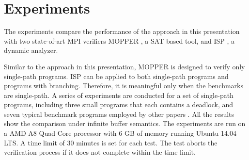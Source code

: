 \section{Experiments}
The experiments compare the performance of the approach in this presentation with two state-of-art MPI verifiers MOPPER \cite{DBLP:conf/fm/ForejtKNS14}, a SAT based tool, and ISP \cite{DBLP:conf/ppopp/VakkalankaSGK08,DBLP:conf/sbmf/SharmaGB12}, a dynamic analyzer. 

Similar to the approach in this presentation, MOPPER is designed to verify only single-path programs. ISP can be applied to both single-path programs and programs with branching. Therefore, it is meaningful only when the benchmarks are single-path.
A series of experiments are conducted for a set of single-path programs, including three small programs \cite{DBLP:conf/fm/ForejtKNS14} that each contains a deadlock, and seven typical benchmark programs employed by other papers \cite{benchmark:mentoCarlo, benchmark:fevs, DBLP:conf/ppopp/XueLWGCZZV09}. All the results show the comparison under infinite buffer semantics.  
The experiments are run on a AMD A8 Quad Core processor with 6 GB of memory running Ubuntu 14.04 LTS. A time limit of 30 minutes is set for each test. The test aborts the verification process if it does not complete within the time limit. 


